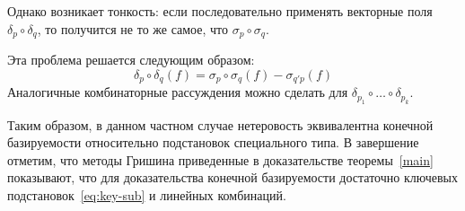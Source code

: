 Однако возникает тонкость: если последовательно применять векторные поля $\delta_p \circ \delta_q$,
то получится не то же самое, что $\sigma_p \circ \sigma_q$.

Эта проблема решается следующим образом:
\[
    \delta_p \circ \delta_q (f) = \sigma_p \circ \sigma_q(f) - \sigma_{q'p} (f)
\]
Аналогичные комбинаторные рассуждения можно сделать для $\delta_{p_1}\circ\ldots\circ\delta_{p_k}$.

Таким образом, в данном частном случае нетеровость эквивалентна конечной базируемости относительно подстановок специального типа.
В завершение отметим, что методы Гришина приведенные в доказательстве теоремы~\ref{main} показывают, что для доказательства конечной базируемости достаточно ключевых подстановок~\ref{eq:key-sub} и линейных комбинаций.